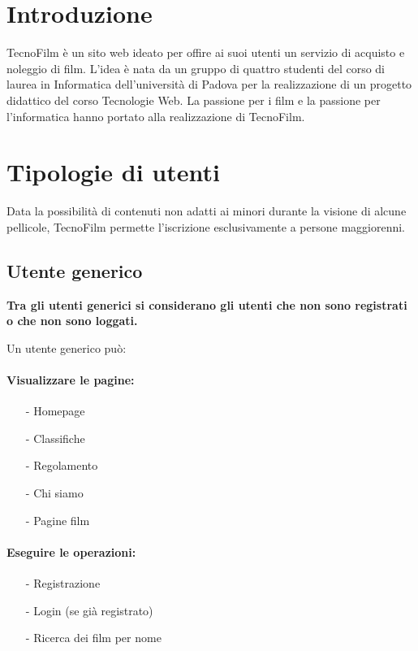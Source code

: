 \documentclass[a4paper]{article}
\begin{document}
\tableofcontents

\newpage
\section{Introduzione}
TecnoFilm è un sito web ideato per offire ai suoi utenti un servizio di acquisto e noleggio di film.
L'idea è nata da un gruppo di quattro studenti del corso di laurea in Informatica dell'università di Padova per la realizzazione di un progetto didattico del corso Tecnologie Web.
La passione per i film e la passione per l'informatica hanno portato alla realizzazione di TecnoFilm.

\section{Tipologie di utenti}
Data la possibilità di contenuti non adatti ai minori durante la visione di alcune pellicole, TecnoFilm permette l'iscrizione esclusivamente a persone maggiorenni.
\subsection{Utente generico}
\textbf{Tra gli utenti generici si considerano gli utenti che non sono registrati o che non sono loggati.}

\noindent Un utente generico può:
    \paragraph*{Visualizzare le pagine:}
        \begin{itemize}
            \item[-] Homepage
            \item[-] Classifiche
            \item[-] Regolamento
            \item[-] Chi siamo
            \item[-] Pagine film
        \end{itemize}
    \paragraph*{Eseguire le operazioni:}
        \begin{itemize}
            \item[-] Registrazione
            \item[-] Login (se già registrato)
            \item[-] Ricerca dei film per nome
        \end{itemize}
\end{document}
